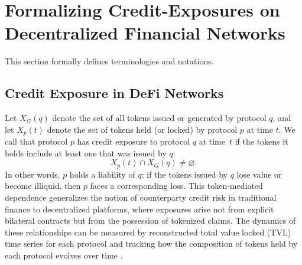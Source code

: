 \section{Formalizing Credit-Exposures on Decentralized Financial Networks}

This section formally defines terminologies and notations. %

\subsection{Credit Exposure in DeFi Networks}

Let $X_G(q)$ denote the set of all tokens issued or generated by protocol $q$, and let $X_p(t)$ denote the set of tokens held (or locked) by protocol $p$ at time $t$.  We call that protocol $p$ has {credit exposure} to protocol $q$ at time~$t$ if the tokens it holds include at least one that was issued by $q$:
\begin{equation}
X_p(t)\cap X_G(q)\neq \varnothing.
\label{eq:credit-exposure-definition}
\end{equation}
In other words, $p$ holds a liability of $q$; if the tokens issued by $q$ lose value or become illiquid, then $p$ faces a corresponding loss.  This token‑mediated dependence generalizes the notion of counterparty credit risk in traditional finance to decentralized platforms, where exposures arise not from explicit bilateral contracts but from the possession of tokenized claims.  The dynamics of these relationships can be measured by reconstructed total value locked (TVL) time series for each protocol and tracking how the composition of tokens held by each protocol evolves over time \cite{wu2025dexposuredatasetbenchmarksinterprotocol}.

